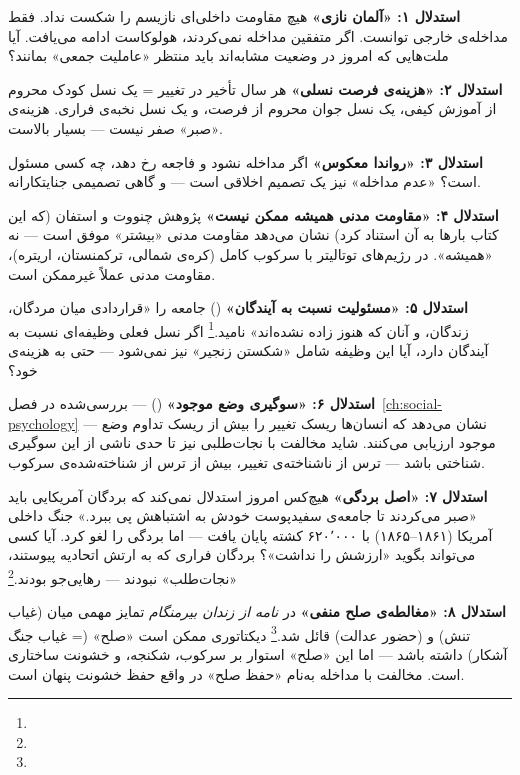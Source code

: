 \begin{tcolorbox}[successbox, title={ده استدلال قوی به نفع نجات‌طلبی فداکارانه}]

\textbf{استدلال ۱: «آلمان نازی»}
هیچ مقاومت داخلی‌ای نازیسم را شکست نداد. فقط مداخله‌ی خارجی توانست. اگر متفقین مداخله نمی‌کردند، هولوکاست ادامه می‌یافت. آیا ملت‌هایی که امروز در وضعیت مشابه‌اند باید منتظر «عاملیت جمعی» بمانند؟

\textbf{استدلال ۲: «هزینه‌ی فرصت نسلی»}
هر سال تأخیر در تغییر = یک نسل کودک محروم از آموزش کیفی، یک نسل جوان محروم از فرصت، و یک نسل نخبه‌ی فراری. هزینه‌ی «صبر» صفر نیست — بسیار بالاست.

\textbf{استدلال ۳: «رواندا معکوس»}
اگر مداخله نشود و فاجعه رخ دهد، چه کسی مسئول است؟ «عدم مداخله» نیز یک تصمیم اخلاقی است — و گاهی تصمیمی جنایتکارانه.

\textbf{استدلال ۴: «مقاومت مدنی همیشه ممکن نیست»}
پژوهش چنووت و استفان (که این کتاب بارها به آن استناد کرد) نشان می‌دهد مقاومت مدنی «بیشتر» موفق است — نه «همیشه». در رژیم‌های توتالیتر با سرکوب کامل (کره‌ی شمالی، ترکمنستان، اریتره)، مقاومت مدنی عملاً غیرممکن است.

\textbf{استدلال ۵: «مسئولیت نسبت به آیندگان»}
 () جامعه را «قراردادی میان مردگان، زندگان، و آنان که هنوز زاده نشده‌اند» نامید.\footnote{} اگر نسل فعلی وظیفه‌ای نسبت به آیندگان دارد، آیا این وظیفه شامل «شکستن زنجیر» نیز نمی‌شود — حتی به هزینه‌ی خود؟

\textbf{استدلال ۶: «سوگیری وضع موجود»}
 () — بررسی‌شده در فصل~\ref{ch:social-psychology} — نشان می‌دهد که انسان‌ها ریسک تغییر را بیش از ریسک تداوم وضع موجود ارزیابی می‌کنند. شاید مخالفت با نجات‌طلبی نیز تا حدی ناشی از این سوگیری شناختی باشد — ترس از ناشناخته‌ی تغییر، بیش از ترس از شناخته‌شده‌ی سرکوب.

\textbf{استدلال ۷: «اصل بردگی»}
هیچ‌کس امروز استدلال نمی‌کند که بردگان آمریکایی باید «صبر می‌کردند تا جامعه‌ی سفیدپوست خودش به اشتباهش پی ببرد.» جنگ داخلی آمریکا (۱۸۶۱–۱۸۶۵) با ۶۲۰٬۰۰۰ کشته پایان یافت — اما بردگی را لغو کرد. آیا کسی می‌تواند بگوید «ارزشش را نداشت»؟ بردگان فراری که به ارتش اتحادیه پیوستند، «نجات‌طلب» نبودند — رهایی‌جو بودند.\footnote{}

\textbf{استدلال ۸: «مغالطه‌ی صلح منفی»}
 در \textit{نامه از زندان بیرمنگام} تمایز مهمی میان  (غیاب تنش) و  (حضور عدالت) قائل شد.\footnote{} دیکتاتوری ممکن است «صلح» (= غیاب جنگ آشکار) داشته باشد — اما این «صلح» استوار بر سرکوب، شکنجه، و خشونت ساختاری است. مخالفت با مداخله به‌نام «حفظ صلح» در واقع حفظ خشونت پنهان است.


\end{tcolorbox}
